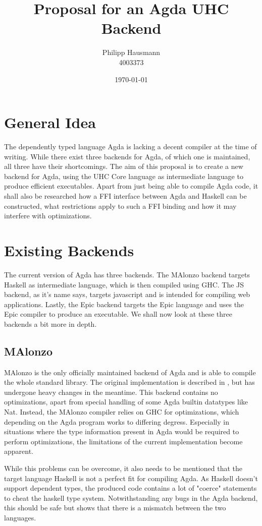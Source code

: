 \documentclass[12pt, a4paper, twoside]{report}
\title{Proposal for an Agda UHC Backend}
\author{Philipp Hausmann \\
    4003373 \\
    }
\date{\today}
\begin{document}
\maketitle

\tableofcontents

\chapter{General Idea}
The dependently typed language Agda is lacking a decent compiler at the time of writing. While there
exist three backends for Agda, of which one is maintained, all three have their shortcomings.
The aim of this proposal is to create a new backend for Agda, using the UHC Core language
as intermediate language to produce efficient executables. Apart from just being able to compile
Agda code, it shall also be researched how a FFI interface between Agda and Haskell can be constructed,
what restrictions apply to such a FFI binding and how it may interfere with optimizations.

\chapter{Existing Backends}
The current version of Agda has three backends. The MAlonzo backend targets Haskell as intermediate
language, which is then compiled using GHC. The JS backend, as it's name says, targets javascript
and is intended for compiling web applications. Lastly, the Epic backend targets the Epic language
and uses the Epic compiler to produce an executable.
We shall now look at these three backends a bit more in depth.


\section{MAlonzo}
MAlonzo is the only officially maintained backend of Agda and is able to compile the whole standard
library. The original implementation is described in \cite{benke2007alonzo}, but has undergone
heavy changes in the meantime.
This backend contains no optimizations, apart from special handling of some Agda builtin
datatypes like Nat. Instead, the MAlonzo compiler relies on GHC for optimizations, which depending
on the Agda program works to differing degress. Especially in situations where the type information
present in Agda would be required to perform optimizations, the limitations of the current implementation
become apparent.

While this problems can be overcome, it also needs to be mentioned that the target language Haskell
is not a perfect fit for compiling Agda. As Haskell doesn't support dependent types, the produced
code contains a lot of "coerce" statements to cheat the haskell type system. Notwithstanding any
bugs in the Agda backend, this should be safe but shows that there is a mismatch between the
two languages.
\end{document}
